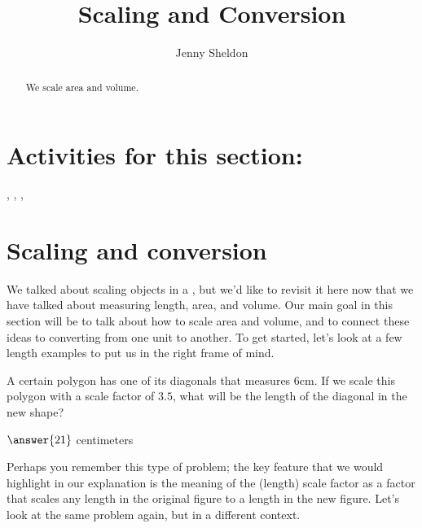 \documentclass{ximera}
\title{Scaling and Conversion}
\author{Jenny Sheldon}
\begin{document}
\begin{abstract}
We scale area and volume.
\end{abstract}
\maketitle

\section{Activities for this section:} 
, 
, 
, 

\section{Scaling and conversion}


We talked about scaling objects in a , but we'd like to revisit it here now that we have talked about measuring length, area, and volume. Our main goal in this section will be to talk about how to scale area and volume, and to connect these ideas to converting from one unit to another. To get started, let's look at a few length examples to put us in the right frame of mind.

\begin{question}
A certain polygon has one of its diagonals that measures $6$cm. If we scale this polygon with a scale factor of $3.5$, what will be the length of the diagonal in the new shape?

\begin{prompt}
$\answer{21}$ centimeters
\end{prompt}
\end{question}
Perhaps you remember this type of problem; the key feature that we would highlight in our explanation is the meaning of the (length) scale factor as a factor that scales any length in the original figure to a length in the new figure. Let's look at the same problem again, but in a different context.
\end{document}
